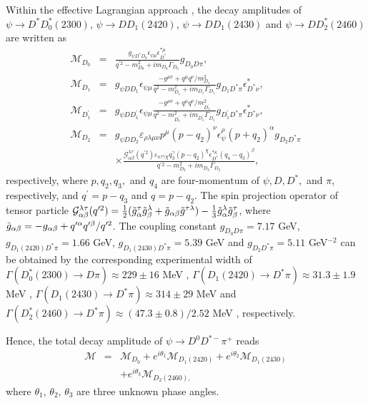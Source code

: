 \documentclass[final,5p,times,twocolumn]{elsarticle}
\begin{document}
Within the effective Lagrangian approach \cite{Casalbuoni:1996pg}, the decay amplitudes of $\psi \to D^*D_0^*(2300)$, $\psi \to DD_1(2420)$, $\psi \to DD_1(2430)$ and $\psi \to DD_2^*(2460)$   are written as 
\begin{eqnarray}
   \mathcal{M}_{D_0}&=&\frac{g_{\psi D^*D_0}\epsilon_{\psi\mu}\epsilon_{D^*}^{*\mu}}{q^{\prime2}-m_{D_0}^2+im_{D_0}\Gamma_{D_0}}g_{D_0 D\pi},  \label{eq:15}\\
   \mathcal{M}_{D_1}&=&g_{\psi DD_1}\epsilon_{\psi\mu}\frac{-g^{\mu\nu}+q^{\mu}q^{\nu}/m_{D_1}^2}{q^2-m_{D_1}^2+im_{D_1}\Gamma_{D_1}}g_{D_1 D^*\pi}\epsilon_{D^*\nu}^*,  \\
    \mathcal{M}_{D_1^{\prime}}&=&g_{\psi DD_1^{\prime}}\epsilon_{\psi\mu}\frac{-g^{\mu\nu}+q^{\mu}q^{\nu}/m_{D_1^{\prime}}^2}{q^2-m_{D_1^{\prime}}^2+im_{D_1^{\prime}}\Gamma_{D_1^{\prime}}}g_{D_1^{\prime} D^*\pi}\epsilon_{D^*\nu}^*,  \\
  \mathcal{M}_{D_2}&=&g_{\psi DD_2}\varepsilon_{\rho\lambda\mu\nu}p^{\mu}(p-q_2)^{\nu}\epsilon_{\psi}^{\rho}(p+q_2)^{\alpha}g_{D_2 D^*\pi} \nonumber \\ && \times \frac{\mathcal{G}_{\alpha\beta}^{\lambda\tau}(q^{\prime2})\varepsilon_{\kappa\tau\gamma\chi}q_3^{\gamma}(p-q_2)^{\chi}\epsilon_{D^*}^{*\kappa}(q_4-q_3)^{\beta}}{q^{\prime2}-m_{D_2}^2+im_{D_2}\Gamma_{D_2}},  \label{eq:18}
\end{eqnarray}
respectively, where $p,q_2,q_3,$ and $q_4$ are four-momentum of $\psi, D, D^*, $ and $ \pi$, respectively, and $q^{\prime}=p-q_3$ and $ q=p-q_2$. The spin projection operator of tensor particle $\mathcal{G}_{\alpha\beta}^{\lambda\tau}(q^{\prime2})=\frac{1}{2}(\Tilde{g}_{\alpha}^{\tau}\Tilde{g}_{\beta}^{\lambda}+\Tilde{g}_{\alpha\beta}\Tilde{g}^{\tau\lambda})-\frac{1}{3}\Tilde{g}_{\alpha}^{\lambda}\Tilde{g}_{\beta}^{\tau}$, where $\Tilde{g}_{\alpha\beta}=-g_{\alpha\beta}+q^{\prime\alpha}q^{\prime\beta}/q^{\prime2}$. The coupling constant $g_{D_0 D\pi}=7.17$ GeV, $g_{D_1(2420) D^*\pi}=1.66$ GeV, $g_{D_1(2430) D^*\pi}=5.39$ GeV and $g_{D_2 D^*\pi}=5.11$ GeV$^{-2}$  can be obtained by the corresponding experimental width of $\Gamma(D_0^*(2300)\to D\pi)\approx229\pm16$ MeV \cite{ParticleDataGroup:2020ssz}, $\Gamma(D_1(2420)\to D^*\pi)\approx31.3\pm1.9$ MeV \cite{ParticleDataGroup:2020ssz},  $\Gamma(D_1(2430)\to D^*\pi)\approx314\pm29$ MeV \cite{ParticleDataGroup:2020ssz} and  $\Gamma(D_2^*(2460)\to D^*\pi)\approx(47.3\pm0.8)/2.52$ MeV \cite{ParticleDataGroup:2020ssz}, respectively.

Hence, the total decay amplitude of $\psi \to D^0D^{*-}\pi^{+}$ reads 
\begin{eqnarray}
\mathcal{M}&=&\mathcal{M}_{D_0}+e^{i\theta_1}\mathcal{M}_{D_1(2420)}+e^{i\theta_2}\mathcal{M}_{D_1(2430)} \nonumber\\
&&+e^{i\theta_3}\mathcal{M}_{D_2(2460),}
\end{eqnarray}
where $\theta_1$, $\theta_2$, $\theta_3$ are three unknown phase angles. %
\end{document}
